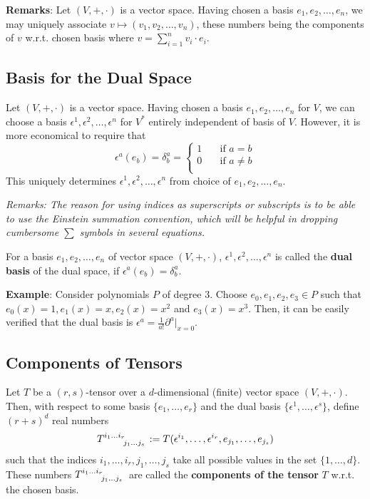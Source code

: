 \textbf{Remarks}: Let $(V,+,\cdot)$ is a vector space. Having chosen a basis $e_1,e_2,\dotsc,e_n$, we may uniquely associate $v \mapsto (v_1,v_2,\dotsc,v_n)$, these numbers being the components of $v$ w.r.t. chosen basis where $v = \displaystyle\sum_{i=1}^n v_i \cdot e_i$.

\subsection{Basis for the Dual Space}
Let $(V,+,\cdot)$ is a vector space. Having chosen a basis $e_1,e_2,\dotsc,e_n$ for $V$, we can choose a basis $\epsilon^1,\epsilon^2,\dotsc,\epsilon^n$ for $V^\ast$ entirely independent of basis of $V$. However, it is more economical to require that
\begin{equation*}
\epsilon^a (e_b) = \delta_b^a = \begin{cases}
1 &\quad \text{if } a = b \\
0 &\quad \text{if } a \neq b \\
\end{cases}
\end{equation*} This uniquely determines $\epsilon^1,\epsilon^2,\dotsc,\epsilon^n$ from choice of $e_1,e_2,\dotsc,e_n$.

\textit{Remarks: The reason for using indices as superscripts or subscripts is to be able to use the Einstein summation convention, which will be helpful in dropping cumbersome $\sum$ symbols in several equations.}

\begin{definition}
For a basis $e_1,e_2,\dotsc,e_n$ of vector space $(V,+,\cdot)$, $\epsilon^1,\epsilon^2,\dotsc,\epsilon^n$ is called the \textbf{dual basis} of the dual space, if $\epsilon^a (e_b) = \delta_b^a$.
\end{definition}

\textbf{Example}: Consider polynomials $P$ of degree 3. Choose $e_0,e_1,e_2,e_3 \in P$ such that $e_0(x) = 1, e_1(x) = x, e_2(x) = x^2$ and $e_3(x) = x^3$. Then, it can be easily verified that the dual basis is $\epsilon^a = \displaystyle\frac{1}{a!}\partial^a\Big|_{x=0}$.

\subsection{Components of Tensors}
\label{ss:L3_TensorComponents}
\begin{definition}
Let $T$ be a $(r,s)$-tensor over a $d$-dimensional (finite) vector space $(V,+,\cdot)$. Then, with respect to some basis $\lbrace e_1, \dotsc, e_r \rbrace$ and the dual basis $\lbrace \epsilon^1, \dotsc, \epsilon^s \rbrace$, define $(r+s)^d$ real numbers
\begin{equation*}
T\indices{^{i_1 \dots i_r}_{j_1 \dots j_s}} := T(\epsilon^{i_1}, \dotsc, \epsilon^{i_r}, e_{j_1}, \dotsc, e_{j_s})
\end{equation*} such that the indices $i_1, \dotsc, i_r, j_1, \dotsc, j_s$ take all possible values in the set $\lbrace 1,\dotsc,d \rbrace$. These numbers $T\indices{^{i_1 \dots i_r}_{j_1 \dots j_s}}$ are called the \textbf{components of the tensor} $T$ w.r.t. the chosen basis.
\end{definition}

